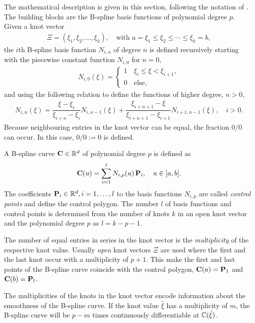 The mathematical description is given in this section, following the notation of \cite{piegl2012nurbs}. The building blocks are the B-spline basis functions of polynomial degree $p$. Given a knot vector 
%
\begin{align*}
  \Xi = (\xi_1, \xi_2, \dots, \xi_k), \quad \text{with } a=\xi_1 \leq \xi_2 \leq \cdots \leq \xi_k = b,
\end{align*}
%
the $i$th B-spline basis function $N_{i,n}$ of degree $n$ is defined recursively starting with the piecewise constant function $N_{i,0}$ for $n=0$,
%
\begin{align*}
  N_{i,0}(\xi) = \begin{cases} 
    1 \, &\xi_i \leq \xi < \xi_{i+1},\\[2mm]
    0 &\text{else},
  \end{cases}
\end{align*}
and using the following relation to define the functions of higher degree, $n > 0$,
\begin{align*}
  N_{i,n}(\xi) = \dfrac{\xi - \xi_i}{\xi_{i+n} - \xi_i} N_{i,n-1}(\xi) + \dfrac{\xi_{i+n+1} - \xi}{\xi_{i+n+1} - \xi_{i+1}} N_{i+1,n-1}(\xi), \quad i > 0.
\end{align*}
Because neighbouring entries in the knot vector can be equal, the fraction $0/0$ can occur. In this case, $0/0 := 0$ is defined.

A B-spline curve $\textbf{C} \in \mathbb{R}^d$ of polynomial degree $p$ is defined as
%
\begin{align*}
  \textbf{C}(u) = \displaystyle\sum\limits_{i=1}^{l}N_{i,p}(u)\,\textbf{P}_i, \quad u \in [a,b].
\end{align*}
%
The coefficients $\textbf{P}_i \in \mathbb{R}^d, i=1, \dots, l$ to the basis functions $N_{i,p}$ are called \emph{control points} and define the control polygon. The number $l$ of basis functions and control points is determined from the number of knots $k$ in an open knot vector and the polynomial degree $p$ as $l = k-p-1$.

The number of equal entries in series in the knot vector is the \emph{multiplicity} of the respective knot value. Usually \emph{open} knot vectors $\Xi$ are used where the first and the last knot occur with a multiplicity of $p+1$.
This make the first and last points of the B-spline curve coincide with the control polygon, $\textbf{C}(a) = \textbf{P}_1$ and $\textbf{C}(b) = \textbf{P}_l$.

The multiplicities of the knots in the knot vector encode information about the smoothness of the B-spline curve. If the knot value $\hat{\xi}$ has a multiplicity of $m$, the B-spline curve will be $p-m$ times continuously differentiable at $\mathbb{C}(\hat{\xi})$.


